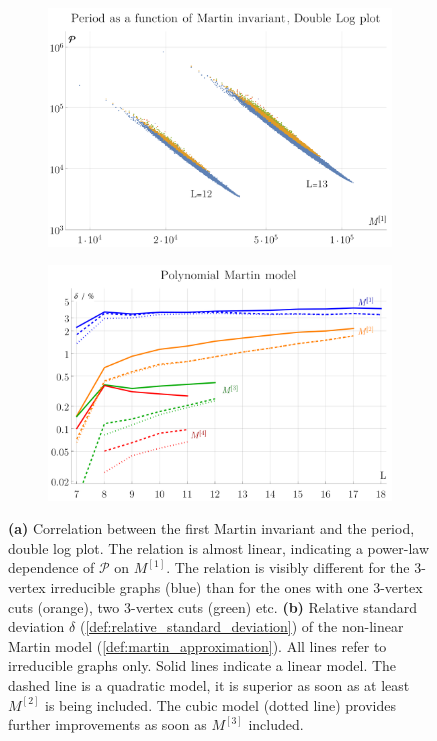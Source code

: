 \documentclass[11pt]{scrartcl}
\numberwithin{equation}{section}
\newcommand{\period}{\mathcal P}
\begin{document}
\begin{figure}[htb]
		\begin{subfigure}{ .49 \linewidth}
		\centering
		\includegraphics[width=\linewidth]{figures/martin_period}
		\subcaption{}
		\label{fig:martin_period}
	\end{subfigure}
	\begin{subfigure}{ .49 \linewidth}
		\centering
		\includegraphics[width=\linewidth]{figures/martin_quadratic_relative_standard_deviation}
		\subcaption{}
		\label{fig:martin_quadratic_relative_standard_deviation}
	\end{subfigure}

	\caption{ 	\textbf{(a)} Correlation between the first Martin invariant and the period, double log plot. The relation is almost linear, indicating a power-law dependence of $\period$ on $M^{[1]}$. The relation is visibly different for the 3-vertex irreducible graphs (blue) than for the ones with one 3-vertex cuts (orange), two 3-vertex cuts (green) etc. 
		\textbf{(b)} Relative standard deviation $\delta$ (\cref{def:relative_standard_deviation}) of the non-linear Martin model (\cref{def:martin_approximation}). All lines refer to irreducible graphs only. Solid lines indicate a linear model. The dashed line is a quadratic model, it is superior as soon as at least $M^{[2]}$ is being included. The cubic model (dotted line) provides further improvements as soon as $M^{[3]}$ included.  
	}
	
\end{figure}
\end{document}
